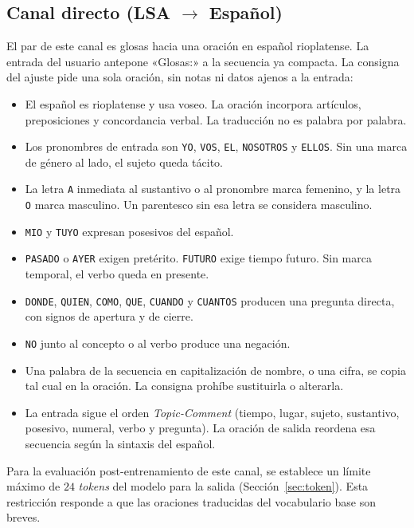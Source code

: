 \subsection{Canal directo (LSA $\rightarrow$ Español)}
El par de este canal es glosas hacia una oración en español rioplatense. La entrada del usuario antepone «Glosas:» a la secuencia ya compacta.
La consigna del ajuste pide una sola oración, sin notas ni datos ajenos a la entrada:
\begin{itemize}
    \item El español es rioplatense y usa voseo. La oración incorpora artículos, preposiciones y concordancia verbal. La traducción no es palabra por palabra.
    \item Los pronombres de entrada son \texttt{YO}, \texttt{VOS}, \texttt{EL}, \texttt{NOSOTROS} y \texttt{ELLOS}. Sin una marca de género al lado, el sujeto queda tácito.
    \item La letra \texttt{A} inmediata al sustantivo o al pronombre marca femenino, y la letra \texttt{O} marca masculino. Un parentesco sin esa letra se considera masculino.
    \item \texttt{MIO} y \texttt{TUYO} expresan posesivos del español.
    \item \texttt{PASADO} o \texttt{AYER} exigen pretérito. \texttt{FUTURO} exige tiempo futuro. Sin marca temporal, el verbo queda en presente.
    \item \texttt{DONDE}, \texttt{QUIEN}, \texttt{COMO}, \texttt{QUE}, \texttt{CUANDO} y \texttt{CUANTOS} producen una pregunta directa, con signos de apertura y de cierre.
    \item \texttt{NO} junto al concepto o al verbo produce una negación.
    \item Una palabra de la secuencia en capitalización de nombre, o una cifra, se copia tal cual en la oración. La consigna prohíbe sustituirla o alterarla.
    \item La entrada sigue el orden \textit{Topic-Comment} (tiempo, lugar, sujeto, sustantivo, posesivo, numeral, verbo y pregunta). La oración de salida reordena esa secuencia según la sintaxis del español.
\end{itemize}
Para la evaluación post-entrenamiento de este canal, se establece un límite máximo de $24$ \textit{tokens} del modelo para la salida (Sección~\ref{sec:token}). Esta restricción responde a que las oraciones traducidas del vocabulario base son breves.

